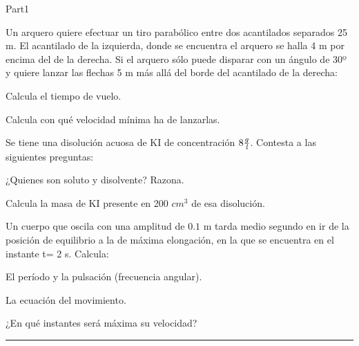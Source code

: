 \documentclass[9pt]{scrartcl}
\begin{document}
\begin{exam}{Part1}
\begin{onehalfspace}
\begin{problem*}[10ea]
Un arquero quiere efectuar un tiro parabólico entre dos acantilados separados 25 m. El acantilado de la izquierda, donde se encuentra el arquero se halla 4 m por encima del de la derecha. Si el arquero sólo puede disparar con un ángulo de 30º y quiere lanzar las flechas 5 m más allá del borde del acantilado de la derecha: 
\begin{parts}
\item Calcula el tiempo de vuelo. 
\item Calcula con qué velocidad mínima ha de lanzarlas.
\end{parts}
\end{problem*}
\begin{problem*}[\auto]Se tiene una disolución acuosa de KI de concentración $8 \frac{g}{{\it l}}$. Contesta a las siguientes preguntas:
	\begin{parts}
	\item {}¿Quienes son soluto y disolvente? Razona.
	\item {}Calcula la masa de KI presente en 200 ${cm^3}$ de esa disolución.
\end{parts}
\begin{solution}[2cm]
\phantom{}
\end{solution}
\begin{workarea}{\sameVspace}
\fbox{\parbox[t][\sameVspace-2\fboxsep-2\fboxrule]{\linewidth-2\fboxsep-2\fboxrule}{\vfill\hfill}}
\end{workarea}
\end{problem*}
\begin{problem*}[10ea]Un cuerpo que oscila con una amplitud de $0.1$ m tarda
medio segundo en ir de la posición de equilibrio a la de máxima elongación,
en la que se encuentra en el instante t= 2 s. Calcula:
\begin{parts}
\item El período y la pulsación (frecuencia angular).
\item La ecuación del movimiento.
\item ¿En qué instantes será máxima su velocidad?
\end{parts}
\end{problem*}
\hrule
\begin{table}[h]

\end{table}
\end{onehalfspace}
\end{exam}
\end{document}

